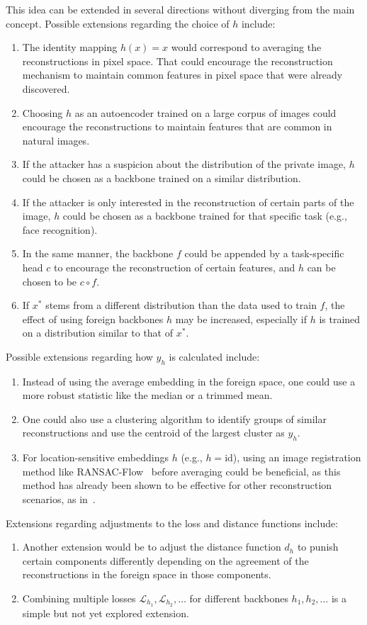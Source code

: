 \documentclass[10pt,twocolumn]{article}
\begin{document}
This idea can be extended in several directions without diverging from the main concept.
Possible extensions regarding the choice of $h$ include:
\begin{enumerate}
    \item The identity mapping $h(x) = x$ would correspond to averaging the reconstructions in pixel space.
    That could encourage the reconstruction mechanism to maintain common features in pixel space that were already discovered.
    \item Choosing $h$ as an autoencoder trained on a large corpus of images could encourage the reconstructions to maintain features that are common in natural images.
    \item If the attacker has a suspicion about the distribution of the private image, $h$ could be chosen as a backbone trained on a similar distribution.
    \item If the attacker is only interested in the reconstruction of certain parts of the image, $h$ could be chosen as a backbone trained for that specific task (e.g., face recognition).
    \item In the same manner, the backbone $f$ could be appended by a task-specific head $c$ to encourage the reconstruction of certain features, and $h$ can be chosen to be $c \circ f$.
    \item If $x^*$ stems from a different distribution than the data used to train $f$, the effect of using foreign backbones $h$ may be increased, especially if $h$ is trained on a distribution similar to that of $x^*$.
\end{enumerate}
Possible extensions regarding how $y_h$ is calculated include:
\begin{enumerate}
    \item Instead of using the average embedding in the foreign space, one could use a more robust statistic like the median or a trimmed mean.
    \item One could also use a clustering algorithm to identify groups of similar reconstructions and use the centroid of the largest cluster as $y_h$.
    \item For location-sensitive embeddings $h$ (e.g., $h=\text{id}$), using an image registration method like RANSAC-Flow~\cite{shenRANSACFlowGenericTwoStage2020} before averaging could be beneficial, as this method has already been shown to be effective for other reconstruction scenarios, as in~\cite{yinSeeGradientsImage2021}.
\end{enumerate}
Extensions regarding adjustments to the loss and distance functions include:
\begin{enumerate}
    \item Another extension would be to adjust the distance function $d_h$ to punish certain components differently depending on the agreement of the reconstructions in the foreign space in those components.
    \item Combining multiple losses $\mathcal{L}_{h_1}, \mathcal{L}_{h_2}, \dots$ for different backbones $h_1, h_2, \dots$ is a simple but not yet explored extension.
\end{enumerate}
\end{document}
